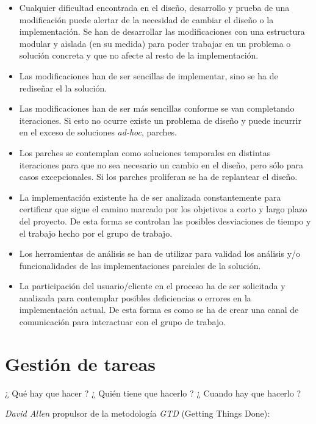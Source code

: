 \begin{itemize}
	\item Cualquier dificultad encontrada en el diseño, desarrollo y prueba de una modificación puede alertar de la necesidad de cambiar el diseño o la implementación. Se han de desarrollar las modificaciones con una estructura modular y aislada (en su medida) para poder trabajar en un problema o solución concreta y que no afecte al resto de la implementación.
	\item Las modificaciones han de ser sencillas de implementar, sino se ha de rediseñar el la solución.
	\item Las modificaciones han de ser más sencillas conforme se van completando iteraciones. Si esto no ocurre existe un problema de diseño y puede incurrir en el exceso de soluciones \emph{ad-hoc}, parches.
	\item Los parches se contemplan como soluciones temporales en distintas iteraciones para que no sea necesario un cambio en el diseño, pero sólo para casos excepcionales. Si los parches proliferan se ha de replantear el diseño.
	\item La implementación existente ha de ser analizada constantemente para certificar que sigue el camino marcado por los objetivos a corto y largo plazo del proyecto. De esta forma se controlan las posibles desviaciones de tiempo y el trabajo hecho por el grupo de trabajo.
	\item Los herramientas de análisis se han de utilizar para validad los análisis y/o funcionalidades de las implementaciones parciales de la solución.
	\item La participación del usuario/cliente en el proceso ha de ser solicitada y analizada para contemplar posibles deficiencias o errores en la implementación actual. De esta forma es como se ha de crear una canal de comunicación para interactuar con el grupo de trabajo.
\end{itemize}



\section{Gestión de tareas}
\label{sec:gestion-tareas}

\par¿ Qué hay que hacer ? ¿ Quién tiene que hacerlo ? ¿ Cuando hay que hacerlo ?

\par \emph{David Allen} propulsor de la metodología \emph{GTD} (Getting Things Done):

